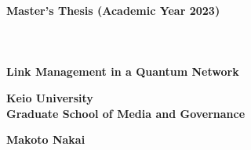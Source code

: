 \begin{titlepage}
  \begin{spacing}{1.6}
  \begin{center}
  \Large 
   \textbf{Master's Thesis (Academic Year 2023)}\\
   \hspace*{\fill}\\
   \hspace*{\fill}\\
   \hspace*{\fill}\\
   \LARGE 
   \textbf{Link Management in a Quantum Network}
   \vspace{8.5cm}
   \end{center}
   \begin{flushleft}
       \Large 
       \textbf{Keio University \\ Graduate School of Media and Governance}
   \end{flushleft}
   \begin{flushright}
    \Large  
    \textbf{Makoto Nakai} 
   \end{flushright}
  \end{spacing}
\end{titlepage}
